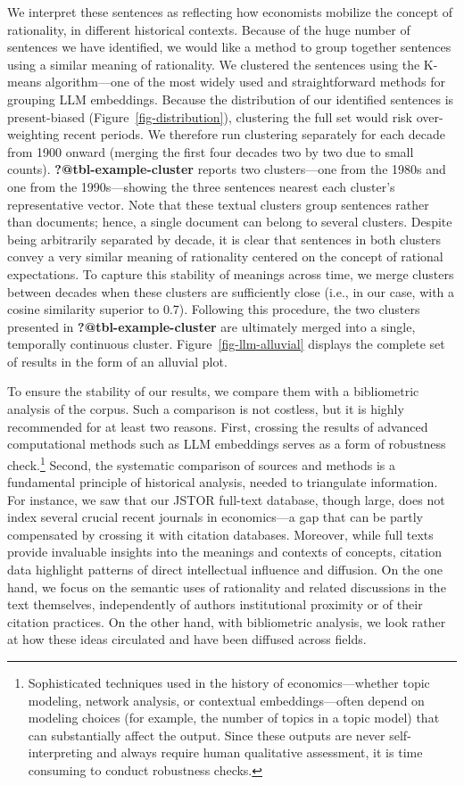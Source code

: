 \documentclass[
]{interact}
\begin{document}
We interpret these sentences as reflecting how economists mobilize the
concept of rationality, in different historical contexts. Because of the
huge number of sentences we have identified, we would like a method to
group together sentences using a similar meaning of rationality. We
clustered the sentences using the K-means algorithm---one of the most
widely used and straightforward methods for grouping LLM embeddings.
Because the distribution of our identified sentences is present-biased
(Figure~\ref{fig-distribution}), clustering the full set would risk
over-weighting recent periods. We therefore run clustering separately
for each decade from 1900 onward (merging the first four decades two by
two due to small counts). \textbf{?@tbl-example-cluster} reports two
clusters---one from the 1980s and one from the 1990s---showing the three
sentences nearest each cluster's representative vector. Note that these
textual clusters group sentences rather than documents; hence, a single
document can belong to several clusters. Despite being arbitrarily
separated by decade, it is clear that sentences in both clusters convey
a very similar meaning of rationality centered on the concept of
rational expectations. To capture this stability of meanings across
time, we merge clusters between decades when these clusters are
sufficiently close (i.e., in our case, with a cosine similarity superior
to 0.7). Following this procedure, the two clusters presented in
\textbf{?@tbl-example-cluster} are ultimately merged into a single,
temporally continuous cluster. Figure~\ref{fig-llm-alluvial} displays
the complete set of results in the form of an alluvial plot.

To ensure the stability of our results, we compare them with a
bibliometric analysis of the corpus. Such a comparison is not costless,
but it is highly recommended for at least two reasons. First, crossing
the results of advanced computational methods such as LLM embeddings
serves as a form of robustness check.\footnote{Sophisticated techniques
  used in the history of economics---whether topic modeling, network
  analysis, or contextual embeddings---often depend on modeling choices
  (for example, the number of topics in a topic model) that can
  substantially affect the output. Since these outputs are never
  self-interpreting and always require human qualitative assessment, it
  is time consuming to conduct robustness checks.} Second, the
systematic comparison of sources and methods is a fundamental principle
of historical analysis, needed to triangulate information. For instance,
we saw that our JSTOR full-text database, though large, does not index
several crucial recent journals in economics---a gap that can be partly
compensated by crossing it with citation databases. Moreover, while full
texts provide invaluable insights into the meanings and contexts of
concepts, citation data highlight patterns of direct intellectual
influence and diffusion. On the one hand, we focus on the semantic uses
of rationality and related discussions in the text themselves,
independently of authors\textquotesingle{} institutional proximity or of
their citation practices. On the other hand, with bibliometric analysis,
we look rather at how these ideas circulated and have been diffused
across fields.
\end{document}
